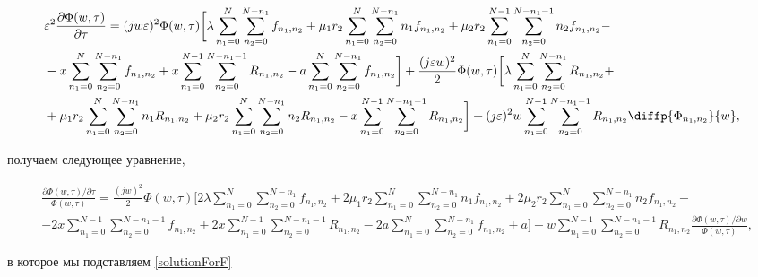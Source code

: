 \begin{equation*}
	\begin{split}
		&\varepsilon^2 \frac{\partial \Phi (w,\tau)}{\partial \tau}=(jw\varepsilon)^2\Phi (w,\tau)\bigg[\lambda\sum_{n_1=0}^N\sum_{n_2=0}^{N-n_1}f_{n_{1}, n_{2}}+\mu_{1}r_{2}\sum_{n_1=0}^{N}\sum_{n_2=0}^{N-n_1}n_{1}f_{n_{1}, n_{2}}+\mu_{2} r_{2}\sum_{n_1=0}^{N-1}\sum_{n_2=0}^{N-n_1-1}n_{2}f_{n_{1}, n_{2}}-\\
		&-x\sum_{n_1=0}^{N}\sum_{n_2=0}^{N-n_1}f_{n_{1}, n_{2}}+x\sum_{n_1=0}^{N-1}\sum_{n_2=0}^{N-n_1-1}R_{n_{1}, n_{2}}-a\sum_{n_1=0}^N\sum_{n_2=0}^{N-n_1}f_{n_{1}, n_{2}}\bigg] +\frac{(j\varepsilon w)^2}{2}\Phi (w,\tau)\bigg[\lambda\sum_{n_1=0}^N\sum_{n_2=0}^{N-n_1}R_{n_{1}, n_{2}}+\\
		&+\mu_{1}r_{2}\sum_{n_1=0}^{N}\sum_{n_2=0}^{N-n_1}n_{1}R_{n_{1}, n_{2}}+\mu_{2} r_{2}\sum_{n_1=0}^{N}\sum_{n_2=0}^{N-n_1}n_{2}R_{n_{1}, n_{2}}-x\sum_{n_1=0}^{N-1}\sum_{n_2=0}^{N-n_1-1}R_{n_{1}, n_{2}}\bigg]+(j\varepsilon)^2 w\sum_{n_1=0}^{N-1}\sum_{n_2=0}^{N-n_1-1}R_{n_{1}, n_{2}}\diffp{\Phi_{n_{1}, n_{2}}}{w},
	\end{split}
\end{equation*}

получаем следующее уравнение,

\begin{equation*}
	\begin{split}
		& \frac{\partial \Phi (w,\tau) /\partial\tau}{ \Phi (w,\tau)}=
		\frac{(j w)^2}{2}\Phi (w,\tau)\bigg[2\lambda\sum_{n_1=0}^N\sum_{n_2=0}^{N-n_1}f_{n_{1}, n_{2}}+2\mu_{1} r_{2}\sum_{n_1=0}^{N}\sum_{n_2=0}^{N-n_1}n_{1}f_{n_{1}, n_{2}}+2\mu_{2}r_{2}\sum_{n_1=0}^{N}\sum_{n_2=0}^{N-n_1}n_{2}f_{n_{1}, n_{2}}-\\
		&-2x\sum_{n_1=0}^{N-1}\sum_{n_2=0}^{N-n_1-1}f_{n_{1}, n_{2}}+2x\sum_{n_1=0}^{N-1}\sum_{n_2=0}^{N-n_1-1}R_{n_{1}, n_{2}}-2a\sum_{n_1=0}^N\sum_{n_2=0}^{N-n_1}f_{n_{1}, n_{2}}+a\bigg]-w\sum_{n_1=0}^{N-1}\sum_{n_2=0}^{N-n_1-1}R_{n_{1}, n_{2}} \frac{\partial \Phi (w,\tau)/\partial w}{ \Phi (w,\tau)},
	\end{split}
\end{equation*}

в которое мы подставляем \eqref{solutionForF}

